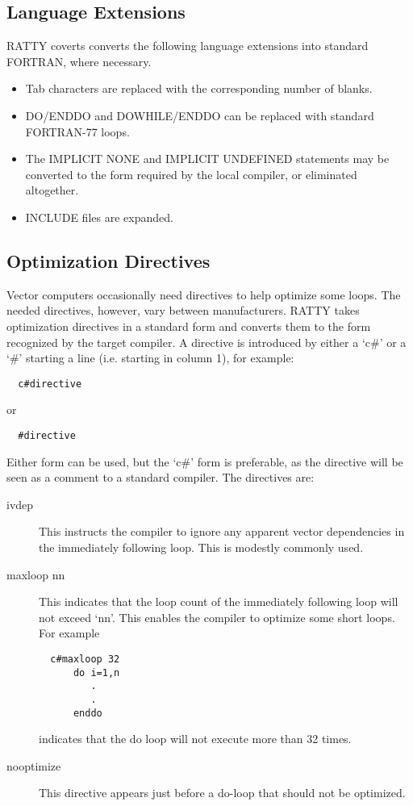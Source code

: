 \documentclass{report}
\begin{document}
\subsection{Language Extensions}
RATTY coverts converts the following language extensions into standard
FORTRAN, where necessary.
\begin{itemize}
\item Tab characters are replaced with the corresponding number of blanks.
\item DO/ENDDO and DOWHILE/ENDDO can be replaced with standard FORTRAN-77
loops.
\item The IMPLICIT NONE and IMPLICIT UNDEFINED statements may be converted
to the form required by the local compiler, or eliminated altogether.
\item INCLUDE files are expanded.
\end{itemize}

\subsection{Optimization Directives}
Vector computers occasionally need directives to help optimize some
loops. The needed directives, however, vary between manufacturers. RATTY
takes optimization directives in a standard form and converts them to
the form recognized by the target compiler. A directive is
introduced by either a
`c\#' or a `\#' starting a line (i.e. starting in column 1), for example:
\begin{verbatim}
  c#directive
\end{verbatim}
or
\begin{verbatim}
  #directive
\end{verbatim}
Either form can be used, but the `c\#' form is preferable, as
the directive will be seen as a comment to a standard
compiler. The directives are:
\begin{description}
\item[ivdep] This instructs the compiler to ignore any apparent
vector dependencies in the immediately following loop.
This is modestly commonly used.
\item[maxloop nn] This indicates that the loop count of the immediately
following loop will not exceed `nn'. This enables the compiler to
optimize some short loops. For example
\begin{verbatim}
  c#maxloop 32
      do i=1,n
         .
         .
      enddo
\end{verbatim}
indicates that the do loop will not execute more than 32 times.
\item[nooptimize] This directive appears just before a do-loop that should
not be optimized.
\end{description}
\end{document}
